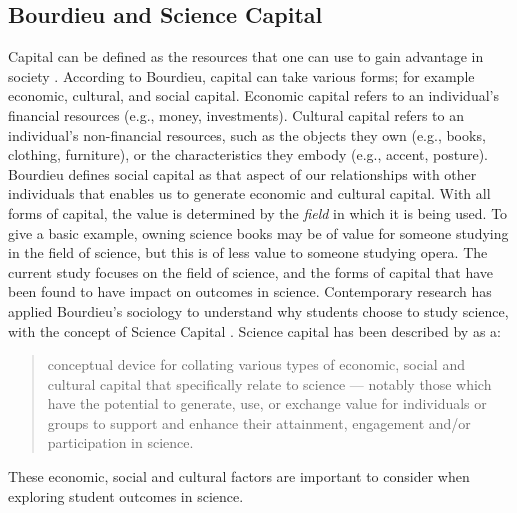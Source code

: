 \subsection*{Bourdieu and Science Capital}
\label{sciencecapital}
Capital can be defined as the resources that one can use to gain advantage in society \cite{Bourdieu_1986}. According to Bourdieu, capital can take various forms; for example economic, cultural, and social capital. Economic capital refers to an individual's financial resources (e.g., money, investments). Cultural capital refers to an individual's non-financial resources, such as the objects they own (e.g., books, clothing, furniture), or the characteristics they embody (e.g., accent, posture). Bourdieu defines social capital as that aspect of our  relationships with other individuals that enables us to generate economic and cultural capital. With all forms of capital, the value is determined by the \textit{field} in which it is being used. To give a basic example, owning science books may be of value for someone studying in the field of science, but this is of less value to someone studying opera. The current study focuses on the field of science, and the forms of capital that have been found to have impact on outcomes in science. Contemporary research has applied Bourdieu's sociology to understand why students choose to study science, with the concept of Science Capital \cite{Archer_2015}. Science capital has been described by \cite{Archer2014} as a:
\begin{quote}
conceptual device for collating various types of economic, social and cultural capital that specifically relate to science --- notably those which have the potential to generate, use, or exchange value for individuals or groups to support and enhance their attainment, engagement and/or participation in science.
\end{quote}
These economic, social and cultural factors are important to consider when exploring student outcomes in science. 

